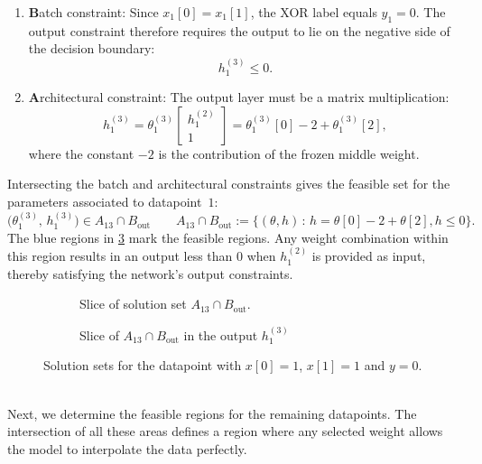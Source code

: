 \begin{enumerate}
  \item \textbf{B}atch constraint: Since $x_1[0]=x_1[1]$, the XOR label equals $y_1=0$. The output constraint therefore requires the output to lie on the negative side of the decision boundary:
\begin{equation*}
h_1^{(3)} \le 0.
\end{equation*}

\item \textbf{A}rchitectural constraint: The output layer must be a matrix multiplication:
\begin{equation*}
h_1^{(3)} = \theta_1^{(3)} \begin{bmatrix} h_1^{(2)} \\ 1 \end{bmatrix}
= \theta_1^{(3)}[0] - 2 + \theta_1^{(3)}[2],
\end{equation*}
where the constant $-2$ is the contribution of the frozen middle weight.
\end{enumerate}
Intersecting the batch and architectural
constraints gives the feasible set for the parameters associated to
datapoint~$1$:
\begin{equation*}
  \bigl(\theta_1^{(3)},\, h_1^{(3)}\bigr) \in A_{13}  \cap B_{\mathrm{out}} \qquad
  A_{13}  \cap B_{\mathrm{out}} := \bigl\{(\theta,h) \,:\, h = \theta[0] - 2 + \theta[2], h \le 0\bigr\}.
\end{equation*}
The blue regions in \cref{fig:xor_output_relation} mark the feasible regions. Any weight combination within this region results in an output less than 0 when $h_1^{(2)}$  is provided as input, thereby satisfying the network's output constraints.
\vspace{1em}
\begin{figure}[h]
\centering
\begin{subfigure}[t]{0.48\textwidth}
\centering

\caption{Slice of solution set $A_{13}\cap B_{\mathrm{out}}$.}
\label{fig:xor_output_relation_w1_wb}
\end{subfigure}
\hfill
\begin{subfigure}[t]{0.48\textwidth}
\centering

\caption{Slice of $A_{13} \cap B_{\mathrm{out}}$ in the output $h_1^{(3)}$}
\label{fig:xor_neg_y}
\end{subfigure}
\caption{Solution sets for the datapoint with $x[0] = 1$, $x[1] = 1$ and $y = 0$.}
\label{fig:xor_output_relation}
\end{figure}
\\
Next, we determine the feasible regions for the remaining datapoints. The intersection
of all these areas defines a region where any selected weight allows the model to
interpolate the data perfectly.
